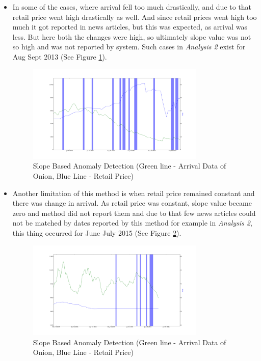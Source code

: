 \documentclass[a4paper,10pt]{report}
\begin{document}
\begin{itemize}
			\item In some of the cases, where arrival fell too much drastically, and due to that retail price went high drastically as well. And since retail prices went high too much it got reported in news articles, but this was expected, as arrival was less. But here both the changes were high, so ultimately slope value was not so high and was not reported by system. Such cases in \textit{Analysis 2} exist for Aug Sept 2013  (See Figure \ref{fig:12125}).
			
			\begin{figure}[H]
		    	\centering
  		    	\includegraphics[width=0.8\textwidth]{graphs/12125.png}
		    	\caption{Slope Based Anomaly Detection (Green line - Arrival Data of Onion, Blue Line - Retail Price)}
		    	\label{fig:12125}
			\end{figure}
			
			\item Another limitation of this method is when retail price remained constant and there was change in arrival. As retail price was constant, slope value became zero and method did not report them and due to that few news articles could not be matched by dates reported by this method for example in \textit{Analysis 2}, this thing occurred for June July 2015  (See Figure \ref{fig:12126}).
			
			\begin{figure}[H]
		    	\centering
  		    	\includegraphics[width=0.8\textwidth]{graphs/12126.png}
		    	\caption{Slope Based Anomaly Detection (Green line - Arrival Data of Onion, Blue Line - Retail Price)}
		    	\label{fig:12126}
			\end{figure}
			
		\end{itemize}
\end{document}

